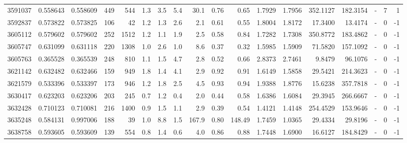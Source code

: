 \begin{tabular}{rrrrrrrrrrrrrrrlrr}
   3591037 & 0.558643 &   0.558609 &  449 &  544 &      1.3 &      3.5 &     5.4 &     30.1 &       0.76 &        0.65 &  1.7929 &  1.7956 &  352.1127 &  182.3154 &             - &        7 &          1 \\
   3592837 & 0.573822 &   0.573825 &  106 &   42 &      1.2 &      1.3 &     2.6 &      2.1 &       0.61 &        0.55 &  1.8004 &  1.8172 &   17.3400 &   13.4174 &             - &        0 &         -1 \\
   3605112 & 0.579602 &   0.579602 &  252 & 1512 &      1.2 &      1.1 &     1.9 &      2.5 &       0.58 &        0.84 &  1.7282 &  1.7308 &  350.8772 &  183.4862 &             - &        0 &         -1 \\
   3605747 & 0.631099 &   0.631118 &  220 & 1308 &      1.0 &      2.6 &     1.0 &      8.6 &       0.37 &        0.32 &  1.5985 &  1.5909 &   71.5820 &  157.1092 &             - &        0 &         -1 \\
   3605763 & 0.365528 &   0.365539 &  248 &  810 &      1.1 &      1.5 &     4.7 &      2.8 &       0.52 &        0.66 &  2.8373 &  2.7461 &    9.8479 &   96.1076 &             - &        0 &         -1 \\
   3621142 & 0.632482 &   0.632466 &  159 &  949 &      1.8 &      1.4 &     4.1 &      2.9 &       0.92 &        0.91 &  1.6149 &  1.5858 &   29.5421 &  214.3623 &             - &        0 &         -1 \\
   3621579 & 0.533396 &   0.533397 &  173 &  946 &      1.2 &      1.8 &     2.5 &      4.5 &       0.93 &        0.94 &  1.9388 &  1.8776 &   15.6238 &  357.7818 &             - &        0 &         -1 \\
   3630417 & 0.623203 &   0.623206 &  203 &  245 &      0.7 &      1.2 &     0.4 &      2.0 &       0.44 &        0.58 &  1.6386 &  1.6084 &   29.3945 &  266.6667 &             - &        0 &         -1 \\
   3632428 & 0.710123 &   0.710081 &  216 & 1400 &      0.9 &      1.5 &     1.1 &      2.9 &       0.39 &        0.54 &  1.4121 &  1.4148 &  254.4529 &  153.9646 &             - &        0 &         -1 \\
   3635248 & 0.584131 &   0.997006 &  188 &   39 &      1.0 &      8.8 &     1.5 &    167.9 &       0.80 &      148.49 &  1.7459 &  1.0365 &   29.4334 &   29.8196 &             - &        0 &         -1 \\
   3638758 & 0.593605 &   0.593609 &  139 &  554 &      0.8 &      1.4 &     0.6 &      4.0 &       0.86 &        0.88 &  1.7448 &  1.6900 &   16.6127 &  184.8429 &             - &        0 &         -1 \\

\end{tabular}

